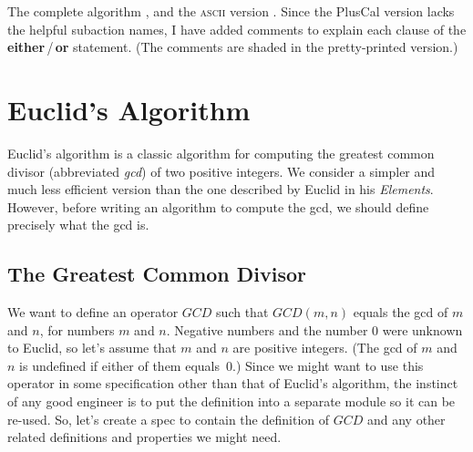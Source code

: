 \documentclass[fleqn,leqno]{article}
\begin{document}
The complete algorithm 
 , and 
the \textsc{ascii} version 
 .
Since the
PlusCal version lacks the helpful subaction names, I have added comments to
explain each clause of the \textbf{either}\,/\,\textbf{or} statement.
(The comments are shaded in the pretty-printed version.)

%

\newpage
{}%
\vspace{-\baselineskip}
\section{Euclid's Algorithm} 

Euclid's algorithm is a classic algorithm 
for computing the greatest common divisor (abbreviated \emph{gcd}) of
two positive integers.  We consider a simpler and much less efficient
version than the one described by Euclid in his \emph{Elements}.
However, before writing an algorithm to compute the gcd, we should
define precisely what the gcd is.


  \vspace{-\baselineskip}
\subsection{The Greatest Common Divisor} 

We want to define an operator $GCD$ such that $GCD(m, n)$ equals the
gcd of $m$ and $n$, for numbers $m$ and $n$.  Negative numbers and the
number 0 were unknown to Euclid, so let's assume that $m$ and $n$ are
positive integers.  (The gcd of $m$ and $n$ is undefined if either of
them equals~0.)  Since we might want to use this operator in some
specification other than that of Euclid's algorithm, the instinct of
any good engineer is to put the definition into a separate module so
it can be re-used.
So, let's create a spec to contain the definition of $GCD$ and any
other related definitions and properties we might need.  
\end{document}
